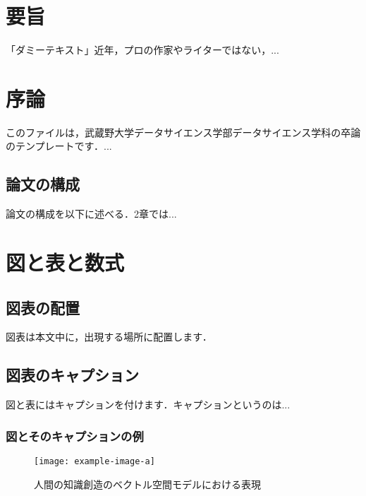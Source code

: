 \documentclass[titlepage,12pt]{ltjsarticle}
\title{卒業論文 \vskip\baselineskip タイトルタイトルタイトル}
\author{武蔵野太郎\\ データサイエンス学科\\ 武蔵野大学}
\date{2025年1月}
\begin{document}
\maketitle

\section*{要旨}
「ダミーテキスト」近年，プロの作家やライターではない，...

\clearpage
\tableofcontents

\section{序論}\label{sec:introduction}
このファイルは，武蔵野大学データサイエンス学部データサイエンス学科の卒論のテンプレートです．...

\subsection{論文の構成}\label{subsec:structure}
論文の構成を以下に述べる．2章では...

\section{図と表と数式}\label{sec:figures_tables_equations}
\subsection{図表の配置}\label{subsec:placement}
図表は本文中に，出現する場所に配置します．

\subsection{図表のキャプション}\label{subsec:caption}
図と表にはキャプションを付けます．キャプションというのは...

\subsubsection{図とそのキャプションの例}\label{subsubsec:figure}
\begin{figure}[htbp]
    \centering
    \texttt{[image: example-image-a]}
    \caption{人間の知識創造のベクトル空間モデルにおける表現}
    \label{fig:vector_space}
\end{figure}
\end{document}
